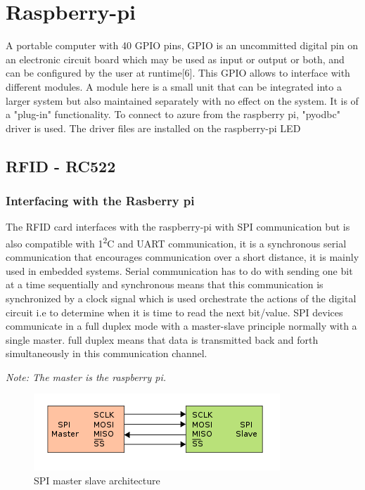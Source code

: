 
\section{Raspberry-pi}
A portable computer with 40 GPIO pins, 
GPIO is an uncommitted digital pin on an electronic circuit board which may be used as input or output or both, and can be configured by the user at runtime[6]. This GPIO allows to interface with different modules. A module here is a small unit that can be integrated into a larger system but also maintained separately with no effect on the system. It is of a "plug-in" functionality.
To connect to azure from the raspberry pi, "pyodbc" driver is used. The driver files are installed on the raspberry-pi
LED  


\subsection{RFID - RC522}
\subsubsection{Interfacing with the Rasberry pi}
The RFID card interfaces with the raspberry-pi with SPI communication but is also compatible with 1\textsuperscript{2}C and UART communication, it is a synchronous serial communication that encourages communication over a short distance, it is mainly used in embedded systems. Serial communication has to do with sending one bit at a time sequentially and synchronous means that this communication is synchronized by a clock signal which is used orchestrate the actions of the digital circuit i.e to determine when it is time to read the next bit/value. SPI devices communicate in a full duplex mode with a master-slave principle normally with a single master. full duplex means that data is transmitted back and forth simultaneously in this communication channel.

\textit{Note: The master is the raspberry pi.}
\vspace{1cm}
\begin{figure}[h]
  \includegraphics{Background/images/350px-SPI_single_slave.svg.png.png}
  \caption{SPI master slave architecture}
\end{figure}

